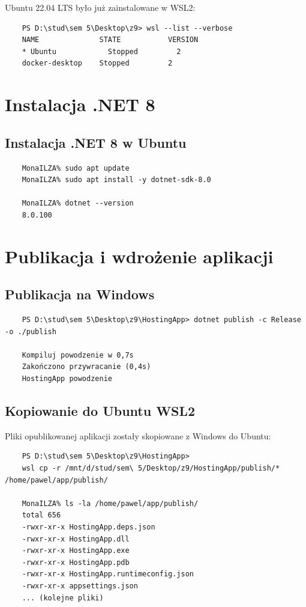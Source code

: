 \documentclass[twoside]{article}
\begin{document}
Ubuntu 22.04 LTS było już zainstalowane w WSL2:

\begin{verbatim}
	PS D:\stud\sem 5\Desktop\z9> wsl --list --verbose
	NAME              STATE           VERSION
	* Ubuntu            Stopped         2
	docker-desktop    Stopped         2

\end{verbatim}

\section{Instalacja .NET 8}

\subsection{Instalacja .NET 8 w Ubuntu}

\begin{verbatim}
	MonaILZA% sudo apt update
	MonaILZA% sudo apt install -y dotnet-sdk-8.0
	
	MonaILZA% dotnet --version
	8.0.100
\end{verbatim}

\section{Publikacja i wdrożenie aplikacji}

\subsection{Publikacja na Windows}

\begin{verbatim}
	PS D:\stud\sem 5\Desktop\z9\HostingApp> dotnet publish -c Release -o ./publish
	
	Kompiluj powodzenie w 0,7s
	Zakończono przywracanie (0,4s)
	HostingApp powodzenie
\end{verbatim}

\subsection{Kopiowanie do Ubuntu WSL2}

Pliki opublikowanej aplikacji zostały skopiowane z Windows do Ubuntu:

\begin{verbatim}
	PS D:\stud\sem 5\Desktop\z9\HostingApp> 
	wsl cp -r /mnt/d/stud/sem\ 5/Desktop/z9/HostingApp/publish/* /home/pawel/app/publish/
	
	MonaILZA% ls -la /home/pawel/app/publish/
	total 656
	-rwxr-xr-x HostingApp.deps.json
	-rwxr-xr-x HostingApp.dll
	-rwxr-xr-x HostingApp.exe
	-rwxr-xr-x HostingApp.pdb
	-rwxr-xr-x HostingApp.runtimeconfig.json
	-rwxr-xr-x appsettings.json
	... (kolejne pliki)
\end{verbatim}
\end{document}

